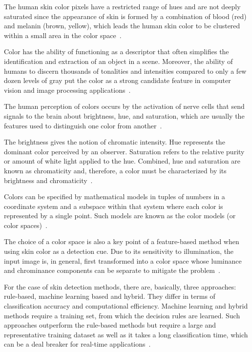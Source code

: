The human skin color pixels have a restricted range of hues and are not deeply saturated since the appearance of skin is formed by a combination of blood (red) and melanin (brown, yellow), which leads the human skin color to be clustered within a small area in the color space~\citep{fleck:96}.

Color has the ability of functioning as a descriptor that often simplifies the identification and extraction of an object in a scene. Moreover, the ability of humans to discern thousands of tonalities and intensities compared to only a few dozen levels of gray put the color as a strong candidate feature in computer vision and image processing applications~\citep{gonzalez:02}.

The human perception of colors occurs by the activation of nerve cells that send signals to the brain about brightness, hue, and saturation, which are usually the features used to distinguish one color from another~\citep{gonzalez:02}.

The brightness gives the notion of chromatic intensity. Hue represents the dominant color perceived by an observer. Saturation refers to the relative purity or amount of white light applied to the hue. Combined, hue and saturation are known as chromaticity and, therefore, a color must be characterized by its brightness and chromaticity~\citep{gonzalez:02}.

Colors can be specified by mathematical models in tuples of numbers in a coordinate system and a subspace within that system where each color is represented by a single point. Such models are known as the color models (or color spaces)~\citep{gonzalez:02}.

The choice of a color space is also a key point of a feature-based method when using skin color as a detection cue. Due to its sensitivity to illumination, the input image is, in general, first transformed into a color space whose luminance and chrominance components can be separate to mitigate the problem~\citep{vezhnevets:03}.

For the case of skin detection methods, there are, basically, three approaches: rule-based, machine learning based and hybrid. They differ in terms of classification accuracy and computational efficiency. Machine learning and hybrid methods require a training set, from which the decision rules are learned. Such approaches outperform the rule-based methods but require a large and representative training dataset as well as it takes a long classification time, which can be a deal breaker for real-time applications~\citep{kakumanu:07}.

